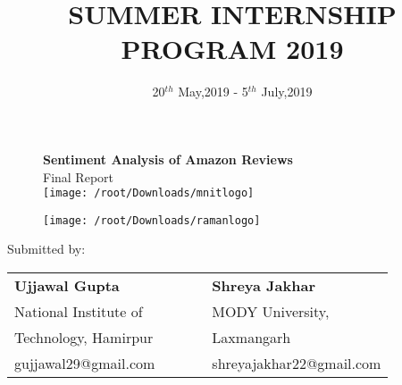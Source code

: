 \documentclass[12pt,a4paper]{report}
\date{ 20$^{th}$ May,2019 - 5$^{th}$ July,2019}
\title{SUMMER INTERNSHIP PROGRAM 2019}
\renewcommand{\thesection}{\arabic{section}}
\begin{document}
\renewcommand{\thesection}{\arabic{section}}
	
\begin{figure}
	\centering
	\maketitle
	{\Large \textbf{Sentiment Analysis of Amazon Reviews}}\\Final Report\\
	\texttt{[image: /root/Downloads/mnitlogo]}
	
	\end{figure}
\begin{figure}[h]
	\centering
	\texttt{[image: /root/Downloads/ramanlogo]}\\
\end{figure}
\begin{table}[h!]
	\begin{center}
		\maketitle
			{\large Submitted by:}\\ 
		
		\begin{tabular}{l l l l l } 

			\textbf{\Large Ujjawal Gupta} &&  &  &\textbf{\Large Shreya Jakhar}\\

			
			National Institute of &  &   &&MODY University,\\

			Technology, Hamirpur            &  &  &   &Laxmangarh             \\

			gujjawal29@gmail.com &  &&   &shreyajakhar22@gmail.com
		\end{tabular}

	\end{center}
\end{table}
\tableofcontents
\end{document}
